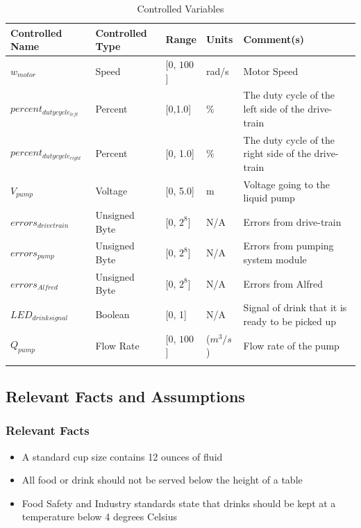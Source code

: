 \documentclass [11pt]{article}
\begin{document}
\begin{longtable}{| p{ } | p{ } | p{} | p{} | p{} |}\hline
\rowcolor{tableCell}\textbf{Controlled Name} & \textbf{Controlled Type} & \textbf{Range} & \textbf{Units} & \textbf{Comment(s)} \\ \hline
    $w_{motor}$ & Speed & [0, $ 100 $]& rad/s &  Motor Speed\\ \hline
    	\rowcolor{tableCell}$ percent_{dutycycle_{left}} $ & Percent & [0,1.0] & \% & The duty cycle of the left side of the drive-train \\ \hline
    $ percent_{dutycycle_{right}} $ & Percent & [0, 1.0]& \% & The duty cycle of the right side of the drive-train\\ \hline
   \rowcolor{tableCell} $  V_{pump} $ & Voltage & [0, 5.0]& m &  Voltage going to the liquid pump \\ \hline
	$ errors_{drivetrain} $ & Unsigned Byte & [0, $2^{8}$]& N/A & Errors from drive-train \\ \hline
	\rowcolor{tableCell}$  errors_{pump} $ & Unsigned Byte & [0, $2^{8}$]& N/A & Errors from pumping system module \\ \hline
	$  errors_{Alfred} $ & Unsigned Byte & [0, $2^{8}$]& N/A & Errors from Alfred \\ \hline
	\rowcolor{tableCell}$LED_{drinksignal}$ & Boolean & [0, 1]& N/A & Signal of drink that it is ready to be picked up \\ \hline
	$Q_{pump}$ & Flow Rate & [0, $ 100 $]& ($m^3/s$) &  Flow rate of the pump\\ \hline

\caption{Controlled Variables}
\end{longtable}


\subsection{Relevant Facts and Assumptions} 

\subsubsection{Relevant Facts}
\begin{itemize}
	\item A standard cup size contains 12 ounces of fluid
	\item All food or drink should not be served below the height of a table
	\item Food Safety and Industry standards state that drinks should be kept at a temperature below 4 degrees Celsius
\end{itemize}
\end{document}
